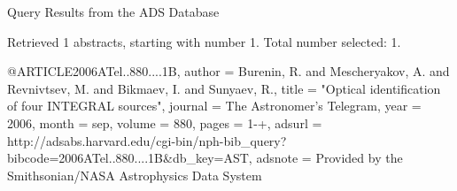 Query Results from the ADS Database


Retrieved 1 abstracts, starting with number 1.  Total number selected: 1.

@ARTICLE{2006ATel..880....1B,
   author = {{Burenin}, R. and {Mescheryakov}, A. and {Revnivtsev}, M. and 
	{Bikmaev}, I. and {Sunyaev}, R.},
    title = "{Optical identification of four INTEGRAL sources}",
  journal = {The Astronomer's Telegram},
     year = 2006,
    month = sep,
   volume = 880,
    pages = {1-+},
   adsurl = {http://adsabs.harvard.edu/cgi-bin/nph-bib_query?bibcode=2006ATel..880....1B&db_key=AST},
  adsnote = {Provided by the Smithsonian/NASA Astrophysics Data System}
}


